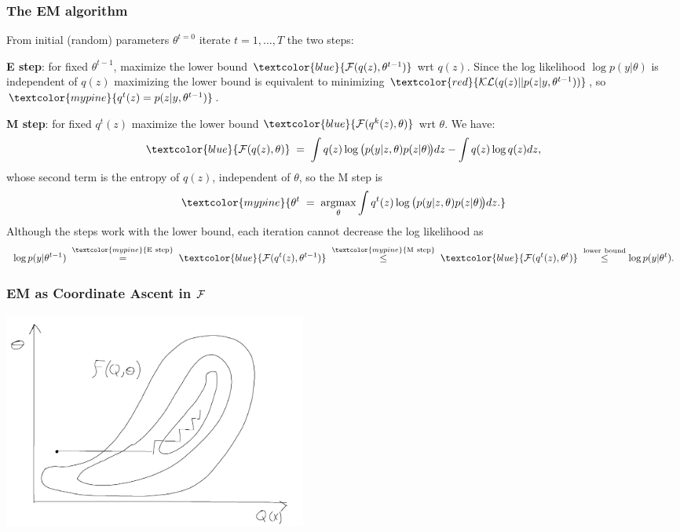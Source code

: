 \documentclass[10pt]{beamer}
\newcommand{\Red}{\textcolor{red}}
\newcommand{\Blue}{\textcolor{blue}}
\newcommand{\Green}{\textcolor{mypine}}
\newcommand{\y}{y}
\newcommand{\z}{z}
\begin{document}
\begin{frame}
\frametitle{The EM algorithm}

From initial (random) parameters $\theta^{t=0}$ iterate $t=1,\ldots,T$ the two steps:

{\bf E step}: for fixed $\theta^{t-1}$, maximize the lower bound $\Blue{{\cal F}(q(\z),\theta^{t-1})}$ wrt $q(\z)$. Since the log likelihood $\log p(\y|\theta)$ is independent of $q(\z)$ maximizing the lower bound is equivalent to minimizing $\Red{{\cal KL}(q(\z)||p(\z|\y,\theta^{t-1}))}$, so $\Green{q^t(\z)=p(\z|\y,\theta^{t-1})}$.

{\bf M step}: for fixed $q^t(\z)$ maximize the lower bound $\Blue{{\cal F}(q^k(\z),\theta)}$ wrt $\theta$. We have:
\[
\Blue{{\cal F}(q(\z),\theta)}\;=\;\int q(\z)\log\big(p(\y|\z,\theta)p(\z|\theta)\!\big)d\z-\int q(\z)\log q(\z)d\z,
\]
whose second term is the entropy of $q(\z)$, independent of $\theta$, so the M step is
\[
\Green{\theta^t\;=\;\underset{\theta}{\rm argmax}\int q^t(\z)\log\big(p(\y|\z,\theta)p(\z|\theta)\!\big)d\z.}
\]
Although the steps work with the lower bound, each iteration cannot decrease the log likelihood as
\[
\log p(\y|\theta^{t-1})\;\overset{\Green{\rm E\ step}}{\!\!\!\!\!\!\phantom{\leq}=}\;\Blue{{\cal F}(q^t(\z),\theta^{t-1})}\;
\overset{\Green{\rm M\ step}}{\leq}\;\Blue{{\cal F}(q^t(\z),\theta^t)}\;
\overset{{\rm lower\ bound}}{\leq}\log p(\y|\theta^t).
\]
\end{frame}


\begin{frame}
\frametitle{EM as Coordinate Ascent in ${\cal F}$}

\centerline{\includegraphics[width=100mm]{fqtheta}}
\end{frame}
\end{document}
